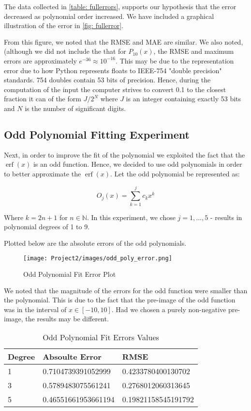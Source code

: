 \documentclass[10pt,a4paper]{article}
\DeclareMathOperator\erf{erf}
\begin{document}
The data collected in \cref{table: fullerrors}, supports our hypothesis that the error decreased as polynomial order increased. We have included a graphical illustration of the error in \cref{fig: fullerror}. 

From this figure, we noted that the RMSE and MAE are similar. We also noted, (although we did not include the  that for $P_{10}(x)$, the RMSE and maximum errors are approximately $e^{-36} \approx 10^{-16}$. This may be due to the representation error due to how Python represents floats to IEEE-754 "double precision" standards. 754 doubles contain 53 bits of precision. Hence, during the computation of the input the computer strives to convert 0.1 to the closest fraction it can of the form $J/2^{N}$ where $J$ is an integer containing exactly 53 bits and $N$ is the number of significant digits.

\subsection*{Odd Polynomial Fitting Experiment}

Next, in order to improve the fit of the polynomial we exploited the fact that the $\erf{(x)}$ is an odd function. Hence, we decided to use odd polynomials in order to better approximate the  $\erf{(x)}$. Let the odd polynomial be represented as:

\begin{equation}
O_j(x) = \sum\limits_{k=1}^j c_k x^k
\label{eqn: odd polynomial}
\end{equation}

Where $k = 2n + 1$ for $n\in \mathbb{N}$. In this experiment, we chose $j = 1, ..., 5$ - results in polynomial degrees of 1 to 9.

Plotted below are the absolute errors of the odd polynomials. 

\begin{figure}[H]
\texttt{[image: Project2/images/odd\_poly\_error.png]}
\centering
\caption{Odd Polynomial Fit Error Plot}
\label{fig: odderror}
\end{figure}

We noted that the magnitude of the errors for the odd function were smaller than the polynomial. This is due to the fact that the pre-image of the odd function was in the interval of $x \in [-10,10]$. Had we chosen a purely non-negative pre-image, the results may be different.

\begin{table}
\centering
\begin{tabular}{l|l|l}
Degree & Absoulte Error     & RMSE                \\ \hline
1      & 0.7104739391052999 & 0.4233780400130702  \\
3      & 0.5789483075561241 & 0.2768012060313645  \\
5      & 0.46551661953661194 & 0.19821158545191792
\end{tabular}
\caption{Odd Polynomial Fit Errors Values}
\label{table: odderrors}
\end{table}
\end{document}
